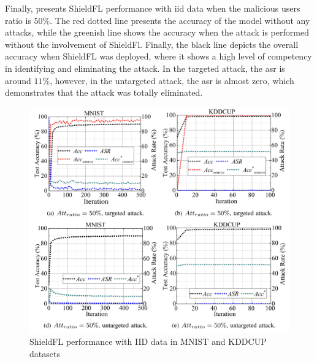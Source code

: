 Finally,  presents ShieldFL performance with \ac{iid} data when the malicious users ratio is $50\%$.
The red dotted line presents the accuracy of the model without any attacks, while the greenish line shows the accuracy when the attack is performed without the involvement of ShieldFl.
Finally, the black line depicts the overall accuracy when ShieldFL was deployed, where it shows a high level of competency in identifying and eliminating the attack.
In the targeted attack, the \ac{asr} is around $11\%$, however, in the untargeted attack, the \ac{asr} is almost zero, which demonstrates that the attack was totally eliminated.

\begin{figure}[thb]
\centering
  \includegraphics[width=0.8\linewidth]{resources/shield-fl-performance-with-iid-data.pdf}
  \caption{ShieldFL performance with IID data in MNIST and KDDCUP datasets}
  \label{fig:shield-fl-performance-with-iid-data}
\end{figure}